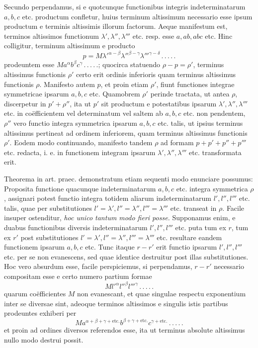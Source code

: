 Secundo perpendamus, si e quotcunque functionibus integris indeterminatarum $a,b,c$ etc. productum confletur, huius terminum altissimum necessario
esse ipsum productum e terminis altissimis illorum factorum. Aeque manifestum
est, terminos altissimos functionum $\lambda',\lambda'',\lambda'''$ etc. resp. esse $a,ab,abc$ etc. Hinc
colligitur, terminum altissimum e producto
\[
p=M{\lambda'}^{\alpha-\beta}{\lambda''}^{\beta-\gamma}{\lambda'''}^{\gamma-\delta}\, .\, .\, .\, .\, .
\]
prodeuntem esse $Ma^\alpha b^\beta c^\gamma\, .\, .\, .\, .\, .$; quocirca statuendo $\rho-p=\rho'$, terminus altissimus functionis $\rho'$ certo erit ordinis inferioris quam terminus altissimus functionis $\rho$. Manifesto autem $p$, et proin etiam $\rho'$, fiunt functiones integrae symmetricae ipsarum $a,b,c$ etc. Quamobrem $\rho'$ perinde tractata, ut antea $\rho$, discerpetur in $p'+\rho''$, ita ut $p'$ sit productum e potestatibus ipsarum $\lambda',\lambda'',\lambda'''$ etc. in
coëfficientem vel determinatum vel saltem ab $a,b,c$ etc. non pendentem, $\rho''$ vero
functio integra symmetrica ipsarum $a,b,c$ etc. talis, ut ipsius terminus altissimus pertineat ad ordinem inferiorem, quam terminus altissimus functionis $\rho'$.
Eodem modo continuando, manifesto tandem $\rho$ ad formam $p+p'+p''+p'''$ etc.
redacta, i. e. in functionem integram ipsarum $\lambda',\lambda'',\lambda'''$ etc. transformata erit.

Theorema in art. praec. demonstratum etiam sequenti modo enunciare possumus: Proposita functione quacunque indeterminatarum $a,b,c$ etc. integra symmetrica $\rho$, assignari potest functio integra totidem aliarum indeterminatarum
$l',l'',l'''$ etc. talis, quae per substitutiones $l'=\lambda',l''=\lambda'',l'''=\lambda'''$ etc. transeat
in $\rho$. Facile insuper ostenditur, \textit{hoc unico tantum modo fieri posse.} Supponamus
enim, e duabus functionibus diversis indeterminatarum $l',l'',l'''$ etc. puta tum
ex $r$, tum ex $r'$ post substitutiones $l'=\lambda',l''=\lambda'',l'''=\lambda'''$ etc. resultare eandem functionem ipsarum $a,b,c$ etc. Tunc itaque $r-r'$ erit functio ipsarum
$l',l'',l'''$ etc. per se non evanescens, sed quae identice destruitur post illas substitutiones. Hoc vero absurdum esse, facile perspiciemus, si perpendamus, $r-r'$
necessario compositam esse e certo numero partium formae
\[
M{l'}^\alpha{l''}^\beta{l'''}^\gamma\, .\, .\, .\, .\, .
\]
quarum coëfficientes $M$ non evanescant, et quae singulae respectu exponentium
inter se diversae sint, adeoque terminos altissimos e singulis istis partibus prodeuntes exhiberi per
\[
Ma^{\alpha+\beta+\gamma+\text{etc.}}b^{\beta+\gamma+\text{etc.}}c^{\gamma+\text{etc.}}\, .\, .\, .\, .\, .
\]
et proin ad ordines diversos referendos esse, ita ut terminus absolute altissimus
nullo modo destrui possit.

